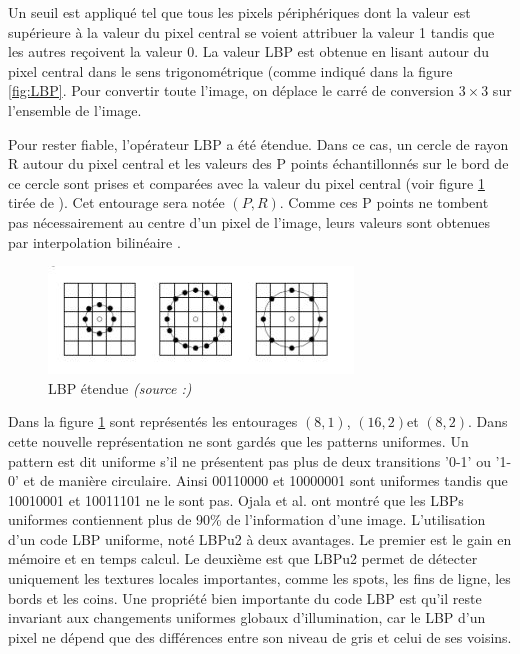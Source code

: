 Un seuil est appliqué tel que tous les pixels périphériques dont la valeur est supérieure à la valeur du pixel central se voient attribuer la valeur 1 tandis que les autres reçoivent la valeur 0. La valeur LBP est obtenue en lisant autour du pixel central dans le sens trigonométrique (comme indiqué dans la figure \ref{fig:LBP}. Pour convertir toute l'image, on déplace le carré de conversion $3\times 3$ sur l'ensemble de l'image.

Pour rester fiable, l'opérateur LBP a été étendue.  Dans ce cas, un cercle de rayon R autour du pixel central et les valeurs des P points échantillonnés sur le bord de ce cercle sont prises et comparées avec la valeur du pixel central (voir figure \ref{fig:lbpam} tirée de \cite{TIM} ). Cet entourage sera notée $(P,R)$. Comme ces P points ne tombent pas nécessairement
au centre d'un pixel de l'image, leurs valeurs sont obtenues par interpolation bilinéaire \cite{TIM}.
\begin{figure}[htbp]
	\centering
		\includegraphics{lbpam.JPG}
	\caption[LBP étendue]{LBP étendue \textit{(source :\cite{TIM})}}
	\label{fig:lbpam}
\end{figure}

Dans la figure \ref{fig:lbpam} sont représentés les entourages $(8,1)$, $(16,2) $et $(8,2)$. Dans cette nouvelle représentation ne sont gardés que les patterns uniformes. Un pattern est dit uniforme s'il ne présentent pas plus de deux transitions '0-1' ou '1-0' et de manière circulaire. Ainsi 00110000 et
10000001 sont uniformes tandis que 10010001 et 10011101 ne le sont pas. Ojala et al. \cite{OJA} ont montré que les  LBPs  uniformes contiennent plus de 90\% de l'information d'une image. L'utilisation d'un code LBP uniforme, noté LBPu2 à deux avantages. Le premier est le  gain  en  mémoire  et  en  temps  calcul.  Le  deuxième  est  que  LBPu2 permet  de  détecter uniquement les textures locales importantes, comme les spots, les fins de ligne, les bords et les coins. Une propriété bien importante du code LBP est qu'il reste invariant aux changements uniformes globaux d'illumination, car le  LBP d'un pixel ne dépend que des différences entre son niveau de gris et celui de ses voisins.
